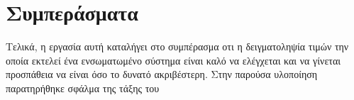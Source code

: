 \documentclass[12pt, a4paper]{article}
\begin{document}
\newpage


\section{Συμπεράσματα}
Τελικά, η εργασία αυτή καταλήγει στο συμπέρασμα οτι η δειγματοληψία τιμών την οποία εκτελεί ένα ενσωματωμένο σύστημα είναι καλό να ελέγχεται και να γίνεται προσπάθεια να είναι όσο το δυνατό ακριβέστερη. Στην παρούσα υλοποίηση παρατηρήθηκε σφάλμα της τάξης του 


\end{document}
